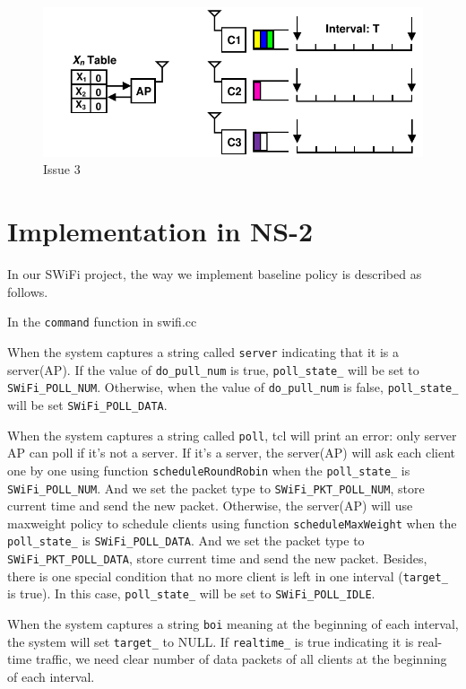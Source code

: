 \documentclass{article}
\begin{document}
\begin{figure}[htbp]
\centering
\includegraphics[scale=0.8]{discussion_3.pdf}
\caption{Issue 3}
\label{discussion_3}
\end{figure}


\section{Implementation in NS-2}
\label{section: ns2}
In our SWiFi project, the way we implement baseline policy is described as follows. 

In the \lstinline |command| function in swifi.cc

When the system captures a string called  \lstinline |server| indicating that it is a server(AP). If the value of  \lstinline |do_pull_num|  is true,  \lstinline |poll_state_|  will be set to  \lstinline |SWiFi_POLL_NUM|. Otherwise, when the value of  \lstinline |do_pull_num|  is false,   \lstinline |poll_state_|  will be set  \lstinline |SWiFi_POLL_DATA|. 


When the system captures a string called  \lstinline |poll|, tcl will print an error: only server AP can poll if it's not a server. If it's a server, the server(AP) will ask each client one by one using function \lstinline |scheduleRoundRobin| when the \lstinline |poll_state_| is  \lstinline |SWiFi_POLL_NUM|. And we set the packet type to \lstinline |SWiFi_PKT_POLL_NUM|, store current time and send the new packet. Otherwise, the server(AP) will use maxweight policy to schedule clients using function \lstinline |scheduleMaxWeight| when the \lstinline |poll_state_| is  \lstinline |SWiFi_POLL_DATA|. And we set the packet type to \lstinline |SWiFi_PKT_POLL_DATA|, store current time and send the new packet. Besides, there is one special condition that no more client is left in one interval (\lstinline |target_| is true). In this case, \lstinline |poll_state_| will be set to \lstinline |SWiFi_POLL_IDLE|.


When the system captures a string \lstinline |boi| meaning at the beginning of each interval, the system will set \lstinline |target_| to NULL. If  \lstinline |realtime_|  is true indicating it is real-time traffic, we need clear number of data packets of all clients at the beginning of each interval. 
\end{document}

